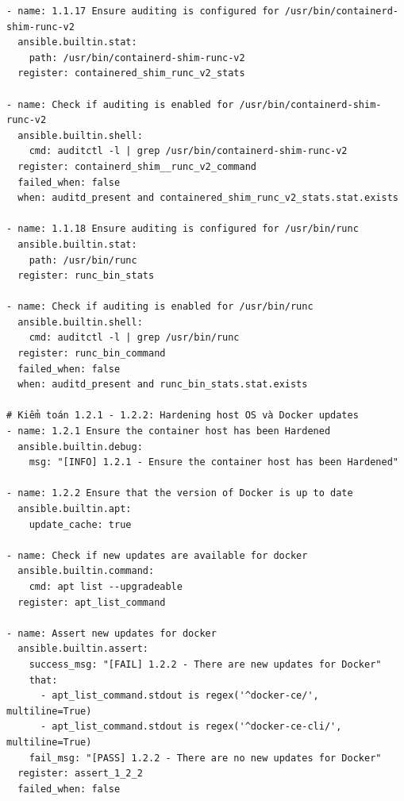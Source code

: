 {\begin{verbatim}
- name: 1.1.17 Ensure auditing is configured for /usr/bin/containerd-shim-runc-v2
  ansible.builtin.stat:
    path: /usr/bin/containerd-shim-runc-v2
  register: containered_shim_runc_v2_stats

- name: Check if auditing is enabled for /usr/bin/containerd-shim-runc-v2
  ansible.builtin.shell:
    cmd: auditctl -l | grep /usr/bin/containerd-shim-runc-v2
  register: containerd_shim__runc_v2_command
  failed_when: false
  when: auditd_present and containered_shim_runc_v2_stats.stat.exists

- name: 1.1.18 Ensure auditing is configured for /usr/bin/runc
  ansible.builtin.stat:
    path: /usr/bin/runc
  register: runc_bin_stats

- name: Check if auditing is enabled for /usr/bin/runc
  ansible.builtin.shell:
    cmd: auditctl -l | grep /usr/bin/runc
  register: runc_bin_command
  failed_when: false
  when: auditd_present and runc_bin_stats.stat.exists

# Kiểm toán 1.2.1 - 1.2.2: Hardening host OS và Docker updates
- name: 1.2.1 Ensure the container host has been Hardened
  ansible.builtin.debug:
    msg: "[INFO] 1.2.1 - Ensure the container host has been Hardened"

- name: 1.2.2 Ensure that the version of Docker is up to date
  ansible.builtin.apt:
    update_cache: true

- name: Check if new updates are available for docker
  ansible.builtin.command:
    cmd: apt list --upgradeable
  register: apt_list_command

- name: Assert new updates for docker
  ansible.builtin.assert:
    success_msg: "[FAIL] 1.2.2 - There are new updates for Docker"
    that:
      - apt_list_command.stdout is regex('^docker-ce/', multiline=True)
      - apt_list_command.stdout is regex('^docker-ce-cli/', multiline=True)
    fail_msg: "[PASS] 1.2.2 - There are no new updates for Docker"
  register: assert_1_2_2
  failed_when: false
\end{verbatim}
}
